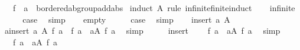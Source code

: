 \begin{isabellebody}
\ \ \ f\ {\isacharcolon}{\kern0pt}{\isacharcolon}{\kern0pt}\ {\isachardoublequoteopen}{\isacharprime}{\kern0pt}a\ {\isasymRightarrow}\ {\isacharprime}{\kern0pt}b{\isacharcolon}{\kern0pt}{\isacharcolon}{\kern0pt}ordered{\isacharunderscore}{\kern0pt}ab{\isacharunderscore}{\kern0pt}group{\isacharunderscore}{\kern0pt}add{\isacharunderscore}{\kern0pt}abs{\isachardoublequoteclose}\isanewline
%
\isadelimproof
%
\endisadelimproof
%
\isatagproof
{}\isamarkupfalse%
\ {\isacharparenleft}{\kern0pt}induct\ A\ rule{\isacharcolon}{\kern0pt}\ infinite{\isacharunderscore}{\kern0pt}finite{\isacharunderscore}{\kern0pt}induct{\isacharparenright}{\kern0pt}\isanewline
\ \ \isamarkupfalse%
\ infinite\isanewline
\ \ \isamarkupfalse%
\ \isamarkupfalse%
\ {\isacharquery}{\kern0pt}case\ \isamarkupfalse%
\ simp\isanewline
{}\isamarkupfalse%
\isanewline
\ \ \isamarkupfalse%
\ empty\isanewline
\ \ \isamarkupfalse%
\ \isamarkupfalse%
\ {\isacharquery}{\kern0pt}case\ \isamarkupfalse%
\ simp\isanewline
{}\isamarkupfalse%
\isanewline
\ \ \isamarkupfalse%
\ {\isacharparenleft}{\kern0pt}insert\ a\ A{\isacharparenright}{\kern0pt}\isanewline
\ \ \isamarkupfalse%
\ \isamarkupfalse%
\ {\isachardoublequoteopen}{\isasymbar}{\isasymSum}a{\isasymin}insert\ a\ A{\isachardot}{\kern0pt}\ {\isasymbar}f\ a{\isasymbar}{\isasymbar}\ {\isacharequal}{\kern0pt}\ {\isasymbar}{\isasymbar}f\ a{\isasymbar}\ {\isacharplus}{\kern0pt}\ {\isacharparenleft}{\kern0pt}{\isasymSum}a{\isasymin}A{\isachardot}{\kern0pt}\ {\isasymbar}f\ a{\isasymbar}{\isacharparenright}{\kern0pt}{\isasymbar}{\isachardoublequoteclose}\ \isamarkupfalse%
\ simp\isanewline
\ \ \isamarkupfalse%
\ \isamarkupfalse%
\ insert\ \isamarkupfalse%
\ {\isachardoublequoteopen}{\isasymdots}\ {\isacharequal}{\kern0pt}\ {\isasymbar}{\isasymbar}f\ a{\isasymbar}\ {\isacharplus}{\kern0pt}\ {\isasymbar}{\isasymSum}a{\isasymin}A{\isachardot}{\kern0pt}\ {\isasymbar}f\ a{\isasymbar}{\isasymbar}{\isasymbar}{\isachardoublequoteclose}\ \isamarkupfalse%
\ simp\isanewline
\ \ \isamarkupfalse%
\ \isamarkupfalse%
\ {\isachardoublequoteopen}{\isasymdots}\ {\isacharequal}{\kern0pt}\ {\isasymbar}f\ a{\isasymbar}\ {\isacharplus}{\kern0pt}\ {\isasymbar}{\isasymSum}a{\isasymin}A{\isachardot}{\kern0pt}\ {\isasymbar}f\ a{\isasymbar}{\isasymbar}{\isachardoublequoteclose}\ \isamarkupfalse%

\end{isabellebody}
